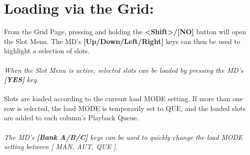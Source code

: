 \section{Loading via the Grid:}
From the Grid Page, pressing and holding the \textbf{<Shift>/[NO]} button will open the Slot Menu. The MD's \textbf{[Up/Down/Left/Right]} keys can then be used to highlight a selection of slots.\\\\
\textit{When the Slot Menu is active, selected slots can be loaded by pressing the MD's \textbf{[YES]} key.}
\\\\Slots are loaded according to the current load MODE setting. If more than one row is selected, the load MODE is temporarily set to QUE, and the loaded slots are added to each column's Playback Queue.
\\\\
\textit{The MD's \textbf{[Bank A/B/C]} keys can be used to quickly change the load MODE setting between [ MAN, AUT, QUE ].}